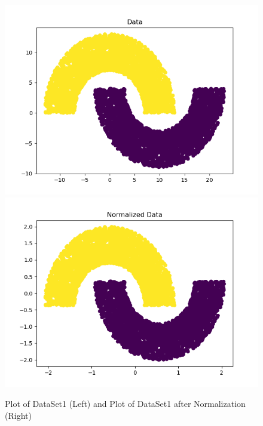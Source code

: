 \documentclass[letterpaper, 12pt]{article}
\begin{document}
\begin{figure}
\centering
\includegraphics[scale = 0.5]{DataSet1Plot}
\includegraphics[scale = 0.5]{DataSet1NormalizedPlot}
\caption{Plot of DataSet1 (Left) and Plot of DataSet1 after Normalization (Right)}
\end{figure}
\end{document}
